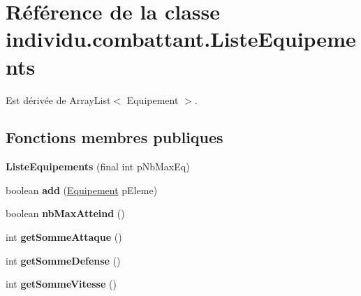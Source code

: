 \hypertarget{classindividu_1_1combattant_1_1_liste_equipements}{\section{Référence de la classe individu.\-combattant.\-Liste\-Equipements}
\label{classindividu_1_1combattant_1_1_liste_equipements}
}


Est dérivée de Array\-List$<$ Equipement $>$.

\subsection*{Fonctions membres publiques}
\begin{DoxyCompactItemize}
\item 
\hypertarget{classindividu_1_1combattant_1_1_liste_equipements_a7504b743eea66dd791f726abd0ce001d}{{\bfseries Liste\-Equipements} (final int p\-Nb\-Max\-Eq)}\label{classindividu_1_1combattant_1_1_liste_equipements_a7504b743eea66dd791f726abd0ce001d}

\item 
\hypertarget{classindividu_1_1combattant_1_1_liste_equipements_a0c42c384b01ae1bee9f699e3ac982a4c}{boolean {\bfseries add} (\hyperlink{classindividu_1_1equipement_1_1_equipement}{Equipement} p\-Eleme)}\label{classindividu_1_1combattant_1_1_liste_equipements_a0c42c384b01ae1bee9f699e3ac982a4c}

\item 
\hypertarget{classindividu_1_1combattant_1_1_liste_equipements_a5b256703d5a9cef1deb013eff6ae34ff}{boolean {\bfseries nb\-Max\-Atteind} ()}\label{classindividu_1_1combattant_1_1_liste_equipements_a5b256703d5a9cef1deb013eff6ae34ff}

\item 
\hypertarget{classindividu_1_1combattant_1_1_liste_equipements_a5b9385493928dd0a8d3d508b4f906e51}{int {\bfseries get\-Somme\-Attaque} ()}\label{classindividu_1_1combattant_1_1_liste_equipements_a5b9385493928dd0a8d3d508b4f906e51}

\item 
\hypertarget{classindividu_1_1combattant_1_1_liste_equipements_af7f605713d45e20433c34de1d27561b3}{int {\bfseries get\-Somme\-Defense} ()}\label{classindividu_1_1combattant_1_1_liste_equipements_af7f605713d45e20433c34de1d27561b3}

\item 
\hypertarget{classindividu_1_1combattant_1_1_liste_equipements_aef396dda965399ad7f729bd9fa013392}{int {\bfseries get\-Somme\-Vitesse} ()}\label{classindividu_1_1combattant_1_1_liste_equipements_aef396dda965399ad7f729bd9fa013392}


\end{DoxyCompactItemize}

